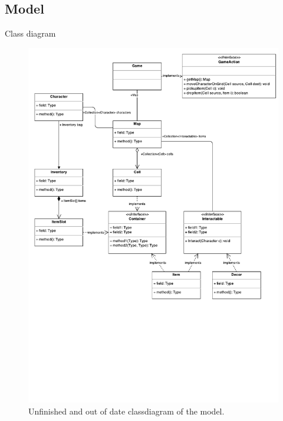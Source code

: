 \subsection{Model}
Class diagram

\begin{figure}[htbp]
	\centering
	\includegraphics[width=\textwidth]{model-classdiagram.pdf}
	\caption{Unfinished and out of date classdiagram of the model.}
\end{figure}

\FloatBarrier